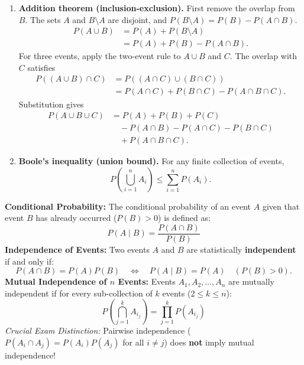 \documentclass[12pt,a4paper]{article}
\begin{document}
\begin{enumerate}[leftmargin=*, itemsep=5pt]
  \item \textbf{Addition theorem (inclusion-exclusion).}
  First remove the overlap from $B$. The sets $A$ and $B\setminus A$ are disjoint, and $P(B\setminus A)=P(B)-P(A\cap B)$.
  \begin{equation}
    \begin{aligned}
      P(A \cup B) &= P(A) + P(B \setminus A) \\
                  &= P(A) + P(B) - P(A \cap B).
    \end{aligned}
  \end{equation}
  For three events, apply the two-event rule to $A\cup B$ and $C$. The overlap with $C$ satisfies
  \[
    \begin{aligned}
      P((A\cup B)\cap C) &= P((A\cap C)\cup(B\cap C)) \\
        &= P(A\cap C) + P(B\cap C) - P(A\cap B\cap C).
    \end{aligned}
  \]
  Substitution gives
  \begin{equation}
    \begin{aligned}
      P(A\cup B\cup C) &= P(A)+P(B)+P(C) \\
        &\quad -P(A\cap B)-P(A\cap C)-P(B\cap C) \\
        &\quad +P(A\cap B\cap C).
    \end{aligned}
  \end{equation}

  \item \textbf{Boole's inequality (union bound).} For any finite collection of events,
  \begin{equation}
    P\left(\bigcup_{i=1}^n A_i\right) \le \sum_{i=1}^n P(A_i).
  \end{equation}
\end{enumerate}

\begin{tcolorbox}[defbox, title={\textbf{Definition: Conditional Probability and Event Independence}}]
\textbf{Conditional Probability:} The conditional probability of an event $A$ given that event $B$ has already occurred ($P(B) > 0$) is defined as:
\begin{equation}
  P(A \mid B) = \frac{P(A \cap B)}{P(B)}
\end{equation}
\textbf{Independence of Events:} Two events $A$ and $B$ are statistically \textbf{independent} if and only if:
\begin{equation}
  P(A \cap B) = P(A)P(B)
  \quad\Longleftrightarrow\quad P(A\mid B)=P(A) \quad (P(B)>0).
\end{equation}
\textbf{Mutual Independence of $n$ Events:} Events $A_1, A_2, \dots, A_n$ are mutually independent if for every sub-collection of $k$ events ($2 \le k \le n$):
\begin{equation}
  P\left(\bigcap_{j=1}^k A_{i_j}\right) = \prod_{j=1}^k P(A_{i_j})
\end{equation}
\textit{Crucial Exam Distinction:} Pairwise independence ($P(A_i \cap A_j) = P(A_i)P(A_j)$ for all $i \ne j$) does \textbf{not} imply mutual independence!
\end{tcolorbox}
\end{document}
